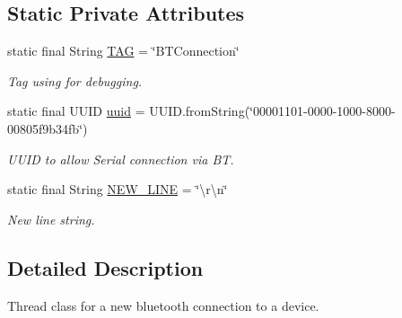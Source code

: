 \subsection*{Static Private Attributes}
\begin{DoxyCompactItemize}
\item 
\mbox{\label{classcom_1_1jack_1_1motorbikestatistics_1_1_b_t_connection_af9455991fec4de29ffc875eae117a761}} 
static final String \hyperlink{classcom_1_1jack_1_1motorbikestatistics_1_1_b_t_connection_af9455991fec4de29ffc875eae117a761}{T\+AG} = \char`\"{}B\+T\+Connection\char`\"{}
\begin{DoxyCompactList}\small\item\em Tag using for debugging. \end{DoxyCompactList}\item 
\mbox{\label{classcom_1_1jack_1_1motorbikestatistics_1_1_b_t_connection_a6551312055376866c73f11721a45e26c}} 
static final U\+U\+ID \hyperlink{classcom_1_1jack_1_1motorbikestatistics_1_1_b_t_connection_a6551312055376866c73f11721a45e26c}{uuid} = U\+U\+I\+D.\+from\+String(\char`\"{}00001101-\/0000-\/1000-\/8000-\/00805f9b34fb\char`\"{})
\begin{DoxyCompactList}\small\item\em U\+U\+ID to allow Serial connection via BT. \end{DoxyCompactList}\item 
\mbox{\label{classcom_1_1jack_1_1motorbikestatistics_1_1_b_t_connection_aacec2fadb24352fd7fdeae731e3ed412}} 
static final String \hyperlink{classcom_1_1jack_1_1motorbikestatistics_1_1_b_t_connection_aacec2fadb24352fd7fdeae731e3ed412}{N\+E\+W\+\_\+\+L\+I\+NE} = \char`\"{}\textbackslash{}r\textbackslash{}n\char`\"{}
\begin{DoxyCompactList}\small\item\em New line string. \end{DoxyCompactList}\end{DoxyCompactItemize}


\subsection{Detailed Description}
Thread class for a new bluetooth connection to a device. 

